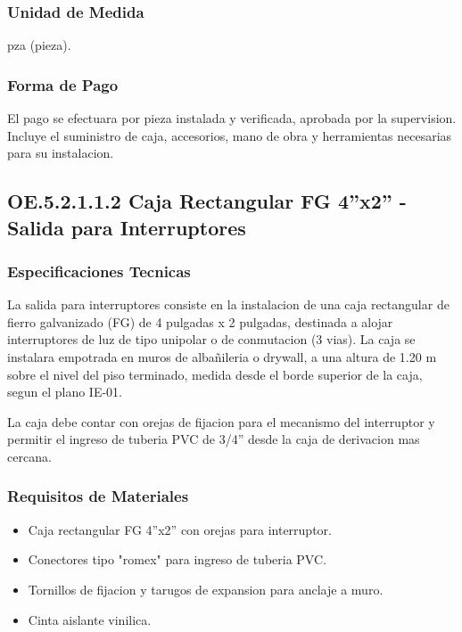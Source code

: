\subsubsection{Unidad de Medida}

pza (pieza).

\subsubsection{Forma de Pago}

El pago se efectuara por pieza instalada y verificada, aprobada por la supervision. Incluye el suministro de caja, accesorios, mano de obra y herramientas necesarias para su instalacion.

\subsection{OE.5.2.1.1.2 Caja Rectangular FG 4''x2'' - Salida para Interruptores}

\subsubsection{Especificaciones Tecnicas}

La salida para interruptores consiste en la instalacion de una caja rectangular de fierro galvanizado (FG) de 4 pulgadas x 2 pulgadas, destinada a alojar interruptores de luz de tipo unipolar o de conmutacion (3 vias). La caja se instalara empotrada en muros de albañileria o drywall, a una altura de 1.20 m sobre el nivel del piso terminado, medida desde el borde superior de la caja, segun el plano IE-01.

La caja debe contar con orejas de fijacion para el mecanismo del interruptor y permitir el ingreso de tuberia PVC de 3/4'' desde la caja de derivacion mas cercana.

\subsubsection{Requisitos de Materiales}

\begin{itemize}
  \item Caja rectangular FG 4''x2'' con orejas para interruptor.
  \item Conectores tipo "romex" para ingreso de tuberia PVC.
  \item Tornillos de fijacion y tarugos de expansion para anclaje a muro.
  \item Cinta aislante vinilica.
\end{itemize}

